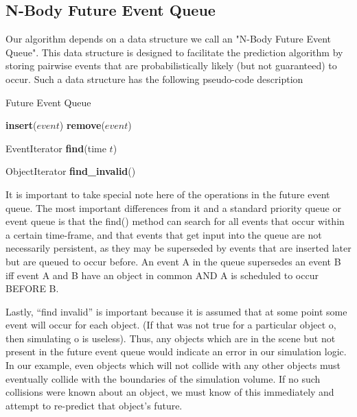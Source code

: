 \documentclass[conference]{IEEEtran}
\begin{document}
\subsection{N-Body Future Event Queue}
\label{sec:neq}
Our algorithm depends on a data structure we call an "N-Body Future Event Queue".  This data structure is designed to facilitate the prediction algorithm
by storing pairwise events that are probabilistically likely (but not guaranteed) to occur.  Such a data structure has the following pseudo-code description
\begin{algorithm}
\caption{Future Event Queue}
\begin{algorithmic}
\STATE {}
\STATE \textbf{insert}($event$)
\STATE {}
\STATE \textbf{remove}($event$)
	
\STATE {}
\STATE EventIterator \textbf{find}(time $t$)

\STATE {}
\STATE ObjectIterator \textbf{find\_invalid}()
\end{algorithmic}
\end{algorithm}

It is important to take special note here of the operations in the future event queue.  The most important differences from it and a standard priority queue or event queue
is that the find() method can search for all events that occur within a certain time-frame, and that events that get input into the queue are not necessarily persistent, as they 
may be superseded by events that are inserted later but are queued to occur before.  An event A in the queue supersedes an event B iff event A and B have an object in common AND A is scheduled to occur BEFORE B.

Lastly, ``find invalid'' is important because it is assumed that at some point some event will occur for each object. (If that was not true for a particular object o, then simulating o is 
useless).  Thus, any objects which are in the scene but not present in the future event queue would indicate an error in our simulation logic.  In our example, even objects which
will not collide with any other objects must eventually collide with the boundaries of the simulation volume.  If no such collisions were known about
an object, we must know of this immediately and attempt to re-predict that object's future.
\end{document}
